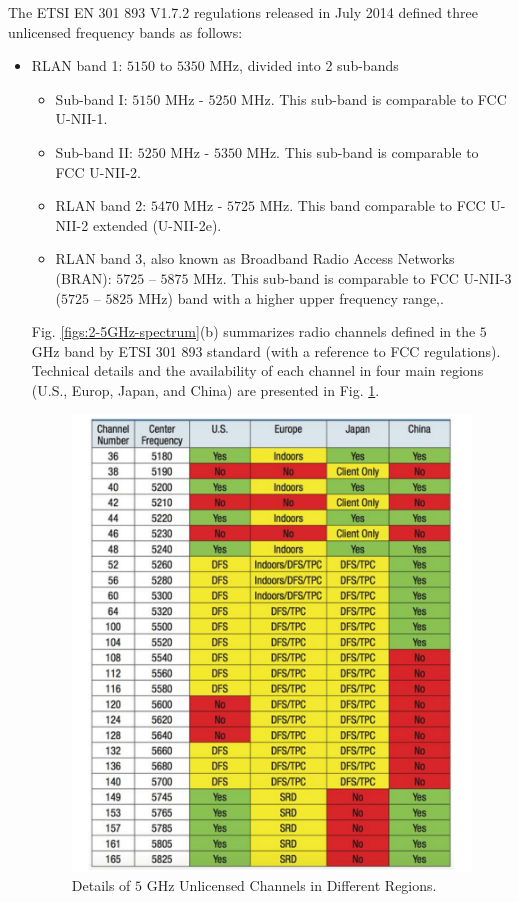 The ETSI EN 301 893 V1.7.2 regulations \cite{LBT-ETSI-2014} released in July 2014 defined three unlicensed frequency bands as follows:
\begin{itemize}
\item
RLAN band 1: $5150$ to $5350$ MHz, divided into 2 sub-bands
\begin{itemize}
\item
Sub-band I: $5150$ MHz - $5250$ MHz. This sub-band is comparable to FCC U-NII-1. 
\item
Sub-band II: $5250$ MHz - $5350$ MHz. This sub-band is comparable to FCC U-NII-2.
\item
RLAN band 2: $5470$ MHz - $5725$ MHz. This band comparable to FCC U-NII-2 extended (U-NII-2e).
\item
RLAN band 3, also known as Broadband Radio Access Networks (BRAN): $5725$ – $5875$ MHz. This sub-band is comparable to FCC U-NII-3 ($5725$ – $5825$ MHz) band with a higher upper frequency range,.
\end{itemize}

Fig. \ref{figs:2-5GHz-spectrum}(b) summarizes radio channels defined in the $5$ GHz band by ETSI 301 893 standard (with a reference to FCC regulations). Technical details and the availability of each channel in four main regions (U.S., Europ, Japan, and China) are presented in Fig. \ref{figs:5GHz-spectrum-table}.

\begin{figure}[!t]
	\centering
	\includegraphics[width=0.85\columnwidth]{figures2/5GHz-spectrum-table.pdf}
	\caption{Details of $5$ GHz Unlicensed Channels in Different Regions.}
	\label{figs:5GHz-spectrum-table}
\end{figure}



\end{itemize}
